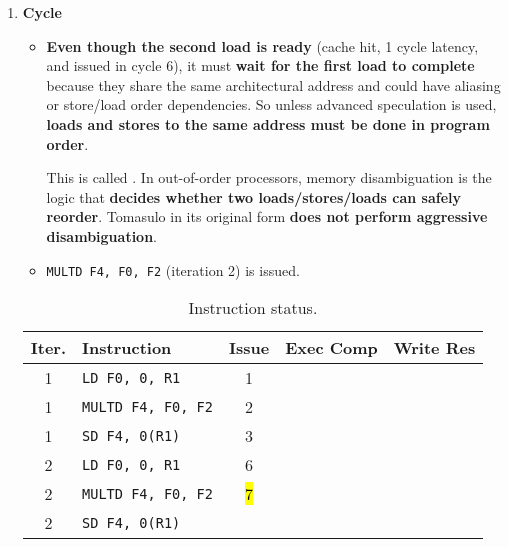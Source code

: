 \begin{enumerate}
    \newpage


    \item \textbf{Cycle \theenumi}
    \begin{itemize}
        \item \textbf{Even though the second load is ready} (cache hit, 1 cycle latency, and issued in cycle 6), it must \textbf{wait for the first load to complete} because they share the same architectural address and could have aliasing or store/load order dependencies. So unless advanced speculation is used, \textbf{loads and stores to the same address must be done in program order}.
        
        This is called . In out-of-order processors, memory disambiguation is the logic that \textbf{decides whether two loads/stores/loads can safely reorder}. Tomasulo in its original form \textbf{does not perform aggressive disambiguation}.


        \item \texttt{MULTD F4, F0, F2} (iteration 2) is issued.
    \end{itemize}
    \begin{table}[!htp]
        \centering
        \begin{tabular}{@{} c l | c c c @{}}
            \toprule
            Iter.       & Instruction                   & Issue & Exec Comp & Write Res \\
            \midrule
            1           & \texttt{LD    F0, 0, R1}      & 1     &           &           \\ [.3em]
            1           & \texttt{MULTD F4, F0, F2}     & 2     &           &           \\ [.3em]
            1           & \texttt{SD    F4, 0(R1)}      & 3     &           &           \\ [.3em]
            2           & \texttt{LD    F0, 0, R1}      & 6     &           &           \\ [.3em]
            2           & \texttt{MULTD F4, F0, F2}     & \hl{7}&           &           \\ [.3em]
            2           & \texttt{SD    F4, 0(R1)}      &       &           &           \\
            \bottomrule
        \end{tabular}
        \caption*{Instruction status.}
    \end{table}


\end{enumerate}
